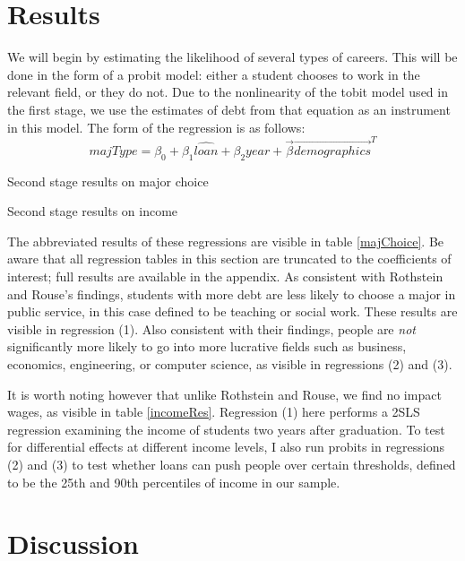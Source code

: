 \documentclass{article}
\newcommand{\regs}{../Analysis/Regressions/Output/}
\begin{document}
	
	\section{Results}
	
	We will begin by estimating the likelihood of several types of careers. This will be done in the form of a probit model: either a student chooses to work in the relevant field, or they do not. Due to the nonlinearity of the tobit model used in the first stage, we use the estimates of debt from that equation as an instrument in this model. The form of the regression is as follows: $$majType = \beta_0 + \beta_1 \hat{loan} + \beta_2 year + \vec{\beta}\vec{demographics}^T$$
	
	\begin{table}
		\centering
		
		
		\caption{Second stage results on major choice}
		\label{majChoice}
	\end{table}

	\begin{table}
		\centering
		
		
		\caption{Second stage results on income}
		\label{incomeRes}
	\end{table}
	
	The abbreviated results of these regressions are visible in table \ref{majChoice}. Be aware that all regression tables in this section are truncated to the coefficients of interest; full results are available in the appendix. As consistent with Rothstein and Rouse's findings, students with more debt are less likely to choose a major in public service, in this case defined to be teaching or social work. These results are visible in regression (1). Also consistent with their findings, people are \emph{not} significantly more likely to go into more lucrative fields such as business, economics, engineering, or computer science, as visible in regressions (2) and (3). 
	
	It is worth noting however that unlike Rothstein and Rouse, we find no impact wages, as visible in table \ref{incomeRes}. Regression (1) here performs a 2SLS regression examining the income of students two years after graduation. To test for differential effects at different income levels, I also run probits in regressions (2) and (3) to test whether loans can push people over certain thresholds, defined to be the 25th and 90th percentiles of income in our sample. 
	
	\section{Discussion}
	
\end{document}
